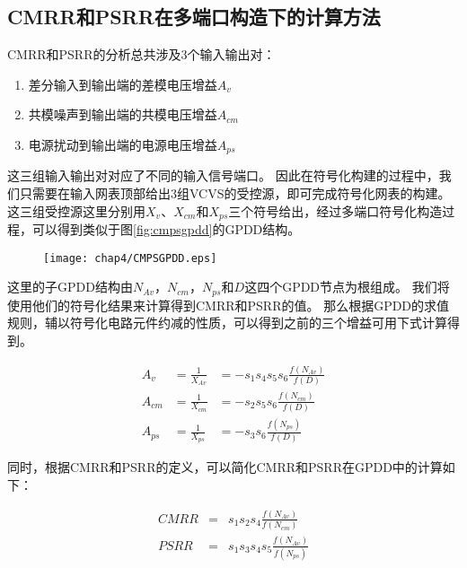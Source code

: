 \subsection{CMRR和PSRR在多端口构造下的计算方法}

CMRR和PSRR的分析总共涉及3个输入输出对：

\begin{enumerate}
	\item 差分输入到输出端的差模电压增益$A_v$
	\item 共模噪声到输出端的共模电压增益$A_{cm}$
	\item 电源扰动到输出端的电源电压增益$A_{ps}$
\end{enumerate}

这三组输入输出对对应了不同的输入信号端口。
因此在符号化构建的过程中，我们只需要在输入网表顶部给出3组VCVS的受控源，即可完成符号化网表的构建。
这三组受控源这里分别用$X_v$、$X_{cm}$和$X_{ps}$三个符号给出，经过多端口符号化构造过程，可以得到类似于图\ref{fig:cmpsgpdd}的GPDD结构。

\begin{figure}[!htp]
	\centering
	\texttt{[image: chap4/CMPSGPDD.eps]}
\end{figure}

这里的子GPDD结构由$N_{Av}$，$N_{cm}$，$N_{ps}$和$D$这四个GPDD节点为根组成。
我们将使用他们的符号化结果来计算得到CMRR和PSRR的值。
那么根据GPDD的求值规则，辅以符号化电路元件约减的性质，可以得到之前的三个增益可用下式计算得到。

\begin{eqnarray}
A_v     &= \frac{1}{X_{Av}} &= - s_1 s_4 s_5 s_6 \frac{f\left(N_{Av}\right)}{f\left(D\right)}\\
A_{cm}  &= \frac{1}{X_{cm}} &= - s_2 s_5 s_6 \frac{f\left(N_{cm}\right)}{f\left(D\right)}\\
A_{ps}  &= \frac{1}{X_{ps}} &= - s_3 s_6 \frac{f\left(N_{ps}\right)}{f\left(D\right)}
\end{eqnarray}

同时，根据CMRR和PSRR的定义，可以简化CMRR和PSRR在GPDD中的计算如下：

\begin{eqnarray}
CMRR &=& s_1 s_2 s_4 \frac{f\left(N_{Av}\right)}{f\left(N_{cm}\right)}\\
PSRR &=& s_1 s_3 s_4 s_5 \frac{f\left(N_{Av}\right)}{f\left(N_{ps}\right)}
\end{eqnarray}

